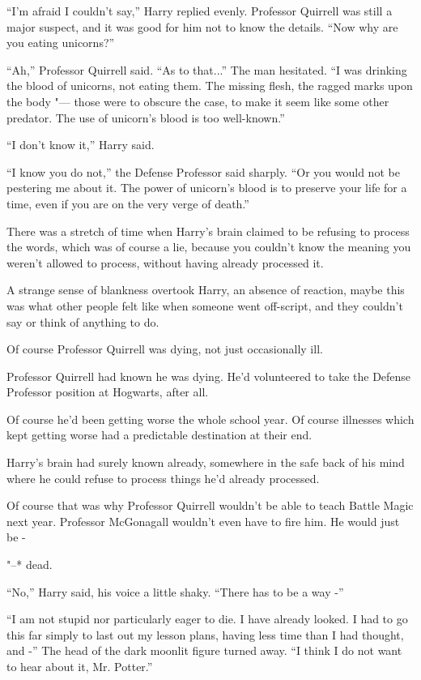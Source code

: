 ``I'm afraid I couldn't say,'' Harry replied evenly. Professor Quirrell
was still a major suspect, and it was good for him not to know the
details. ``Now why are you eating unicorns?''

``Ah,'' Professor Quirrell said. ``As to that...'' The man
hesitated. ``I was drinking the blood of unicorns, not eating them. The
missing flesh, the ragged marks upon the body "--- those were to obscure
the case, to make it seem like some other predator. The use of unicorn's
blood is too well-known.''

``I don't know it,'' Harry said.

``I know you do not,'' the Defense Professor said sharply. ``Or you
would not be pestering me about it. The power of unicorn's blood is to
preserve your life for a time, even if you are on the very verge of
death.''

There was a stretch of time when Harry's brain claimed to be refusing to
process the words, which was of course a lie, because you couldn't know
the meaning you weren't allowed to process, without having already
processed it.

A strange sense of blankness overtook Harry, an absence of reaction,
maybe this was what other people felt like when someone went off-script,
and they couldn't say or think of anything to do.

Of course Professor Quirrell was dying, not just occasionally ill.

Professor Quirrell had known he was dying. He'd volunteered to take the
Defense Professor position at Hogwarts, after all.

Of course he'd been getting worse the whole school year. Of course
illnesses which kept getting worse had a predictable destination at
their end.

Harry's brain had surely known already, somewhere in the safe back of
his mind where he could refuse to process things he'd already processed.

Of course that was why Professor Quirrell wouldn't be able to teach
Battle Magic next year. Professor McGonagall wouldn't even have to fire
him. He would just be -

"--* dead.

``No,'' Harry said, his voice a little shaky. ``There has to be a way
-''

``I am not stupid nor particularly eager to die. I have already looked.
I had to go this far simply to last out my lesson plans, having less
time than I had thought, and -'' The head of the dark moonlit figure
turned away. ``I think I do not want to hear about it, Mr. Potter.''

